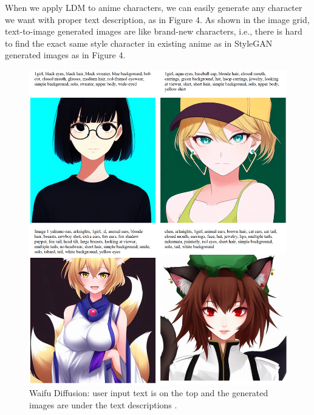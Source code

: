 When we apply LDM to anime characters,
we can easily generate any character we want with proper text description, as in Figure 4.
As shown in the image grid,
text-to-image generated images are like brand-new characters,
i.e., there is hard to find the exact same style character in existing anime as in StyleGAN generated images as in Figure 4.
\begin{figure}[]
    \begin{center}
    \includegraphics[width=\textwidth]{img/waifu_diffusion.png}
    \end{center}
    \caption{
        Waifu Diffusion:
        user input text is on the top
        and the generated images are under the text descriptions \cite{WaifuDiffusion}.
    }
\end{figure}

\newpage